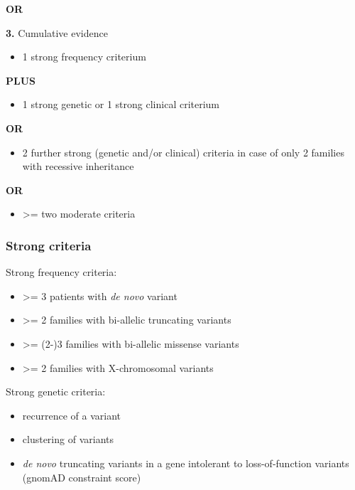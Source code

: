 \documentclass[
]{article}
\providecommand{\tightlist}{%
  \setlength{\itemsep}{0pt}\setlength{\parskip}{0pt}}
\begin{document}
\textbf{OR}

\textbf{3.} Cumulative evidence

\begin{itemize}
\tightlist
\item
  1 strong frequency criterium
\end{itemize}

\textbf{PLUS}

\begin{itemize}
\tightlist
\item
  1 strong genetic or 1 strong clinical criterium
\end{itemize}

\textbf{OR}

\begin{itemize}
\tightlist
\item
  2 further strong (genetic and/or clinical) criteria in case of only 2 families with recessive inheritance
\end{itemize}

\textbf{OR}

\begin{itemize}
\tightlist
\item
  \textgreater= two moderate criteria
\end{itemize}

\hypertarget{strong-criteria}{%
\subsubsection{Strong criteria}\label{strong-criteria}}

Strong frequency criteria:

\begin{itemize}
\tightlist
\item
  \textgreater= 3 patients with \emph{de novo} variant
\item
  \textgreater= 2 families with bi-allelic truncating variants
\item
  \textgreater= (2-)3 families with bi-allelic missense variants
\item
  \textgreater= 2 families with X-chromosomal variants
\end{itemize}

Strong genetic criteria:

\begin{itemize}
\tightlist
\item
  recurrence of a variant
\item
  clustering of variants
\item
  \emph{de novo} truncating variants in a gene intolerant to loss-of-function variants (gnomAD constraint score)
\end{itemize}
\end{document}
